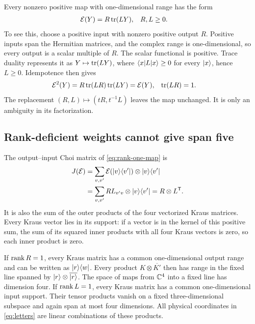 Every nonzero positive map with one-dimensional range has the form
\begin{align}
	\mathcal{E}(Y) & =R\operatorname{tr}(LY),
	         &
	R,L      & \geq0.
	\label{eq:rank-one-map}
\end{align}
To see this, choose a positive input with nonzero positive output
$R$. Positive inputs span the Hermitian matrices, and the complex
range is one-dimensional, so every output is a scalar multiple of
$R$. The scalar functional is positive. Trace duality represents it
as $Y\mapsto\operatorname{tr}(LY)$, where
$\langle x\rvert L\lvert x\rangle\geq0$ for every $\lvert x\rangle$, hence $L\geq0$.
Idempotence then gives
\begin{align}
	\mathcal{E}^2(Y)
	        & =R\operatorname{tr}(LR)\operatorname{tr}(LY)=\mathcal{E}(Y),
	        &
	\operatorname{tr}(LR) & =1.
	\label{eq:weight-normalization}
\end{align}
The replacement $(R,L)\mapsto(tR,t^{-1}L)$ leaves the map unchanged.
It is only an ambiguity in its factorization.

\subsection{Rank-deficient weights cannot give span five}

The output--input Choi matrix of \cref{eq:rank-one-map} is
\begin{align}
	J(\mathcal{E})
	 & =\sum_{v,v'}\mathcal{E}(\lvert v\rangle\langle v'\rvert)
	\otimes\lvert v\rangle\langle v'\rvert
	\nonumber                                    \\
	 & =\sum_{v,v'}RL_{v'v}\otimes\lvert v\rangle\langle v'\rvert
	=R\otimes L^{\mathsf T}.
	\label{eq:transfer-choi}
\end{align}
It is also the sum of the outer products of the four vectorized
Kraus matrices. Every Kraus vector lies in its support: if a vector
is in the kernel of this positive sum, the sum of its squared inner
products with all four Kraus vectors is zero, so each inner product
is zero.

If $\operatorname{rank} R=1$, every Kraus matrix has a common one-dimensional
output range and can be written as $\lvert r\rangle\langle w\rvert$.
Every product $K\otimes\overline{K'}$ then has range in the fixed
line spanned by $\lvert r\rangle\otimes\overline{\lvert r\rangle}$. The space of maps
from $\mathbb{C}^4$ into a fixed line has dimension four.
If $\operatorname{rank} L=1$, every Kraus matrix has a common one-dimensional
input support. Their tensor products vanish on a fixed
three-dimensional subspace and again span at most four dimensions.
All physical coordinates in \cref{eq:letters} are linear
combinations of these products.

